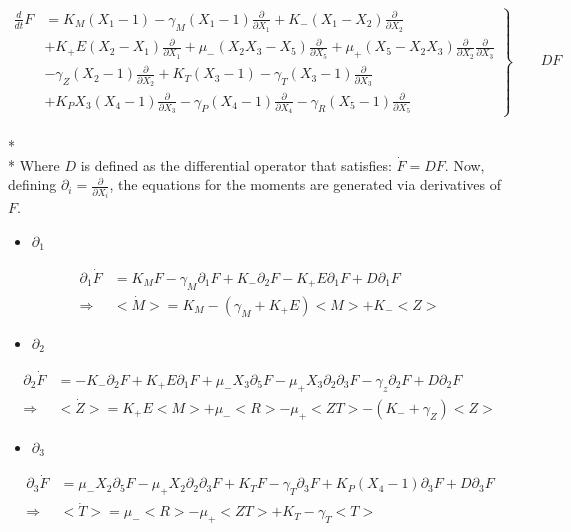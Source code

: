 \documentclass{article}
\begin{document}
\begin{equation}
    \left.\begin{aligned}
            \frac{d}{dt}F &= K_M(X_1-1) - \gamma_M(X_1-1)\frac{\partial}{\partial X_1} + K_-(X_1-X_2)\frac{\partial}{\partial X_2}\\
                          &+ K_+E(X_2-X_1)\frac{\partial}{\partial X_1} + \mu_-(X_2X_3-X_5)\frac{\partial}{\partial X_5} + \mu_+(X_5-X_2X_3)\frac{\partial}{\partial X_2}\frac{\partial}{\partial X_3}\\
                          &- \gamma_Z(X_2-1)\frac{\partial}{\partial X_2} + K_T(X_3-1) - \gamma_T(X_3-1)\frac{\partial}{\partial X_3}\\
                          &+ K_PX_3(X_4-1)\frac{\partial}{\partial X_3} - \gamma_P(X_4-1)\frac{\partial}{\partial X_4} - \gamma_R(X_5-1)\frac{\partial}{\partial X_5}
            \end{aligned}
    \right\}
    \qquad DF
 \end{equation}
\\*
\\*
Where $D$ is defined as the differential operator that satisfies: $\Dot{F} = DF$. Now, defining $\partial_i = \frac{\partial}{\partial X_i}$, the equations for the moments are generated via derivatives of $F$.

\begin{itemize}
    \item $\partial_1$
\end{itemize}
\begin{align*}
    \partial_1\Dot{F} &= K_MF - \gamma_M\partial_1F + K_-\partial_2F - K_+E\partial_1F + D\partial_1F\\
      \Longrightarrow & <\Dot{M}> = K_M - (\gamma_M+K_+E)<M> + K_-<Z>
\end{align*}

\begin{itemize}
    \item $\partial_2$
\end{itemize}
\begin{align*}
    \partial_2\Dot{F} &= -K_-\partial_2F + K_+E\partial_1F + \mu_-X_3\partial_5F - \mu_+X_3\partial_2\partial_3F - \gamma_z\partial_2F + D\partial_2F\\
    \Longrightarrow   &<\Dot{Z}> = K_+E<M> + \mu_-<R> - \mu_+<ZT> - (K_-+\gamma_Z)<Z>
\end{align*}

\begin{itemize}
    \item $\partial_3$
\end{itemize}
\begin{align*}
    \partial_3\Dot{F} &= \mu_-X_2\partial_5F - \mu_+X_2\partial_2\partial_3F + K_TF - \gamma_T\partial_3F + K_P(X_4-1)\partial_3F + D\partial_3F\\
    \Longrightarrow   & <\Dot{T}> = \mu_-<R> - \mu_+<ZT> + K_T - \gamma_T<T>
\end{align*}
\end{document}
